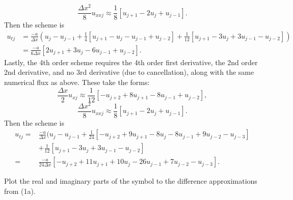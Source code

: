 $$\frac{\Delta x^2}{8}u_{xxj}\approx\frac{1}{8}[u_{j+1}-2u_{j}+u_{j-1}].$$
Then the scheme is
\begin{align*}
u_{tj}&=\frac{-a}{\Delta x}(u_j-u_{j-1}+\frac{1}{4}[u_{j+1}-u_j-u_{j-1}+u_{j-2}]+\frac{1}{12}[u_{j+1}-3u_j+3u_{j-1}-u_{j-2}])\\
&=\frac{-a}{6\Delta x}[2u_{j+1}+3u_{j}-6u_{j-1}+u_{j-2}].
\end{align*}
Lastly, the 4th order scheme requires the 4th order first derivative, the 2nd order 2nd derivative, and no 3rd derivative (due to cancellation), along with the same numerical flux as above. These take the forms:
$$\frac{\Delta x}{2}u_{xj}\approx\frac{1}{12}[-u_{j+2}+8u_{j+1}-8u_{j-1}+u_{j-2}],$$
$$\frac{\Delta x^2}{8}u_{xxj}\approx\frac{1}{8}[u_{j+1}-2u_{j}+u_{j-1}].$$
Then the scheme is
\begin{align*}
u_{tj}=&\frac{-a}{\Delta x}(u_j-u_{j-1}+\frac{1}{24}[-u_{j+2}+9u_{j+1}-8u_j-8u_{j-1}+9u_{j-2}-u_{j-3}]\\
&+\frac{1}{12}[u_{j+1}-3u_j+3u_{j-1}-u_{j-2}]\\
=&\frac{-a}{24\Delta x}[-u_{j+2}+11u_{j+1}+10u_j-26u_{j-1}+7u_{j-2}-u_{j-3}].
\end{align*}


\item Plot the real and imaginary parts of the symbol to the difference approximations from (1a).\\


